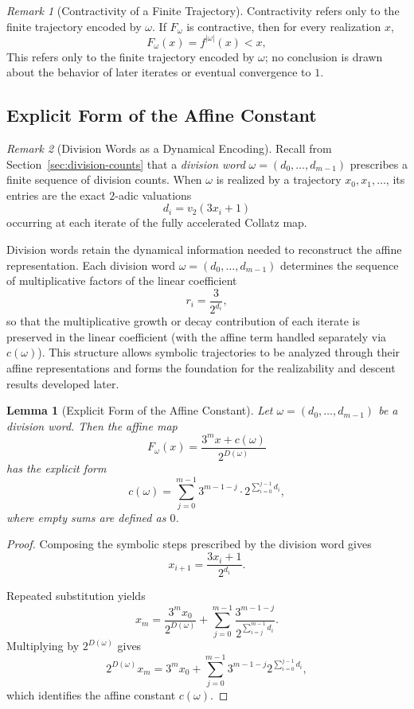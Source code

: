 \documentclass[12pt, oneside]{article}
\numberwithin{equation}{section}
\theoremstyle{definition}
\theoremstyle{plain}
\newtheorem{lemma}[theorem]{Lemma}
\theoremstyle{remark}
\newtheorem*{remark}{Remark}
\begin{document}
\begin{remark}[Contractivity of a Finite Trajectory]
Contractivity refers only to the finite trajectory encoded by \(\omega\).
If \(F_\omega\) is contractive, then for every realization \(x\),
\[
F_\omega(x)=f^{|\omega|}(x)<x,
\]
This refers only to the finite trajectory encoded by \(\omega\); no conclusion
is drawn about the behavior of later iterates or eventual convergence to \(1\).
\end{remark}

\subsection{Explicit Form of the Affine Constant}

\begin{remark}[Division Words as a Dynamical Encoding]
Recall from Section~\ref{sec:division-counts} that a \emph{division word}
$\omega=(d_0,\dots,d_{m-1})$ prescribes a finite sequence of division counts.
When \(\omega\) is realized by a trajectory \(x_0,x_1,\dots\), its entries
are the exact \(2\)-adic valuations
\[
d_i = v_2(3 x_i + 1)
\]
occurring at each iterate of the fully accelerated Collatz map.

Division words retain the dynamical information needed to reconstruct the
affine representation. Each division word $\omega=(d_0,\dots,d_{m-1})$
determines the sequence of multiplicative factors of the linear coefficient
\[
r_i = \frac{3}{2^{d_i}},
\]
so that the multiplicative growth or decay contribution of each iterate is
preserved in the linear coefficient (with the affine term handled separately
via $c(\omega)$). This structure allows symbolic trajectories to be analyzed
through their affine representations and forms the foundation for the
realizability and descent results developed later.
\end{remark}

\begin{lemma}[Explicit Form of the Affine Constant]
Let $\omega = (d_0,\dots,d_{m-1})$ be a division word. Then the affine map
\[
F_\omega(x) = \frac{3^m x + c(\omega)}{2^{D(\omega)}}
\]
has the explicit form
\[
c(\omega)
=
\sum_{j=0}^{m-1}
3^{m-1-j}\cdot 2^{\sum_{i=0}^{j-1} d_i},
\]
where empty sums are defined as $0$.
\end{lemma}

\begin{proof}
Composing the symbolic steps prescribed by the division word gives
\[
x_{i+1}=\frac{3x_i+1}{2^{d_i}}.
\]

Repeated substitution yields
\[
x_m
=
\frac{3^m x_0}{2^{D(\omega)}}
+
\sum_{j=0}^{m-1}
\frac{
3^{m-1-j}
}{
2^{\sum_{i=j}^{m-1} d_i}
}.
\]
Multiplying by \(2^{D(\omega)}\) gives
\[
2^{D(\omega)}x_m
=
3^m x_0
+
\sum_{j=0}^{m-1}
3^{m-1-j}
2^{\sum_{i=0}^{j-1} d_i},
\]
which identifies the affine constant \(c(\omega)\).
\end{proof}
\end{document}
